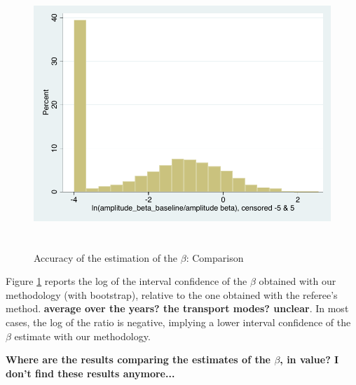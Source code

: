 \documentclass[a4paper,12pt]{article}
\begin{document}
\begin{itemize}
\begin{itemize}
\begin{figure}[htbp]
\caption{Accuracy of the estimation of the $\beta$: Comparison}
\label{fig:accuracy_beta}
\begin{center}
\includegraphics[height=4in]{accuracy_beta.pdf}
\end{center}
\end{figure}

Figure \ref{fig:accuracy_beta} reports the log of the interval confidence of the $\beta$ obtained with our methodology (with bootstrap), relative to the one obtained with the referee's method. \textbf{average over the years? the transport modes? unclear}. In most cases, the log of the ratio is negative, implying a lower interval confidence of the $\beta$ estimate with our methodology.
        
    \end{itemize}
\end{itemize}


\textbf{Where are the results comparing the estimates of the $\beta$, in value? I don't find these results anymore...}
\end{document}
